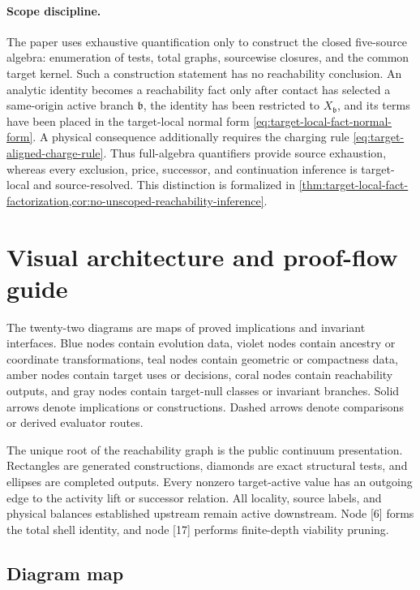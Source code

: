 \documentclass[11pt]{article}
\numberwithin{section}{part}
\theoremstyle{plain}
\theoremstyle{definition}
\theoremstyle{remark}
\begin{document}
\paragraph{Scope discipline.}
The paper uses exhaustive quantification only to construct the closed
five-source algebra: enumeration of tests, total graphs, sourcewise closures,
and the common target kernel.  Such a construction statement has no
reachability conclusion.  An analytic identity becomes a reachability fact
only after contact has selected a same-origin active branch
\(\mathfrak b\), the identity has been restricted to
\(X_{\mathfrak b}\), and its terms have been placed in the target-local
normal form \eqref{eq:target-local-fact-normal-form}.  A physical consequence
additionally requires the charging rule
\eqref{eq:target-aligned-charge-rule}.  Thus full-algebra quantifiers provide
source exhaustion, whereas every exclusion, price, successor, and
continuation inference is target-local and source-resolved.  This distinction
is formalized in
\cref{thm:target-local-fact-factorization,cor:no-unscoped-reachability-inference}.

\section*{Visual architecture and proof-flow guide}
\label{sec:visual-guide}

The twenty-two diagrams are maps of proved implications and invariant
interfaces.  Blue nodes contain evolution data, violet nodes contain ancestry
or coordinate transformations, teal nodes contain geometric or compactness
data, amber nodes contain target uses or decisions, coral nodes contain
reachability outputs, and gray nodes contain target-null classes or invariant
branches.  Solid arrows denote implications or
constructions.
Dashed arrows denote comparisons or derived evaluator routes.

The unique root of the reachability graph is the public continuum presentation.
Rectangles are generated constructions, diamonds are exact structural tests,
and ellipses are completed outputs.  Every nonzero target-active value has an
outgoing edge to the activity lift or successor relation.  All locality,
source labels, and physical balances established upstream remain active
downstream.  Node [6] forms the total shell identity, and node [17] performs
finite-depth viability pruning.

\subsection*{Diagram map}
\end{document}
